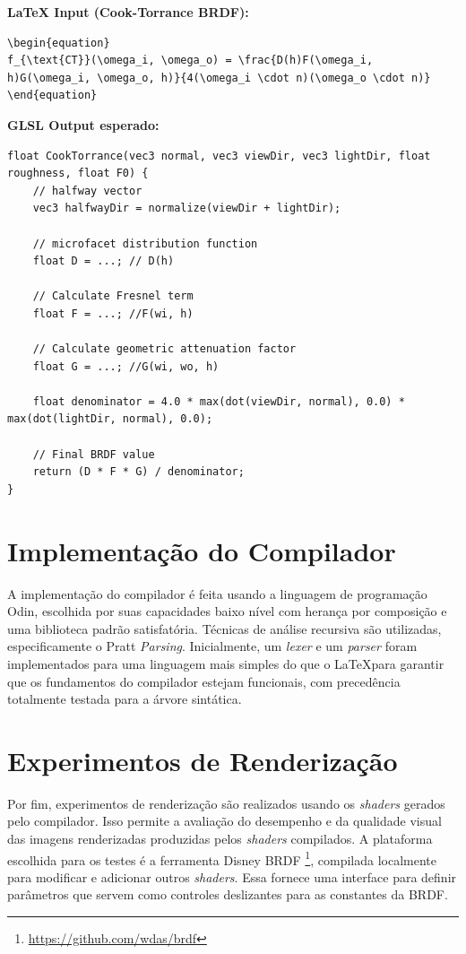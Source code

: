 \documentclass[english, 
               brazil, 
               bsc] %
               {dcomp-abntex2}
\begin{document}
\textbf{LaTeX Input (Cook-Torrance BRDF):}
\begin{verbatim}
\begin{equation}
f_{\text{CT}}(\omega_i, \omega_o) = \frac{D(h)F(\omega_i, h)G(\omega_i, \omega_o, h)}{4(\omega_i \cdot n)(\omega_o \cdot n)}
\end{equation}
\end{verbatim}

\textbf{GLSL Output esperado:}
\begin{verbatim}
float CookTorrance(vec3 normal, vec3 viewDir, vec3 lightDir, float roughness, float F0) {
    // halfway vector
    vec3 halfwayDir = normalize(viewDir + lightDir);

    // microfacet distribution function
    float D = ...; // D(h)

    // Calculate Fresnel term
    float F = ...; //F(wi, h) 

    // Calculate geometric attenuation factor
    float G = ...; //G(wi, wo, h)

    float denominator = 4.0 * max(dot(viewDir, normal), 0.0) * max(dot(lightDir, normal), 0.0);

    // Final BRDF value
    return (D * F * G) / denominator;
}
\end{verbatim}

\section{Implementação do Compilador} \label{compiladorimplementacao}

A implementação do compilador é feita usando a linguagem de programação Odin, escolhida por suas capacidades baixo nível com herança por composição e uma biblioteca padrão satisfatória. Técnicas de análise recursiva são utilizadas, especificamente o Pratt \textit{Parsing}. Inicialmente, um \textit{lexer} e um \textit{parser} foram implementados para uma linguagem mais simples do que o \LaTeX  para garantir que os fundamentos do compilador estejam funcionais, com precedência totalmente testada para a árvore sintática.

\section{Experimentos de Renderização}

Por fim, experimentos de renderização são realizados usando os \textit{shaders} gerados pelo compilador. Isso permite a avaliação do desempenho e da qualidade visual das imagens renderizadas produzidas pelos \textit{shaders} compilados. A plataforma escolhida para os testes é a ferramenta Disney BRDF \footnote{\url{https://github.com/wdas/brdf}}, compilada localmente para modificar e adicionar outros \textit{shaders}. Essa fornece uma interface para definir parâmetros que servem como controles deslizantes para as constantes da BRDF.
\end{document}
